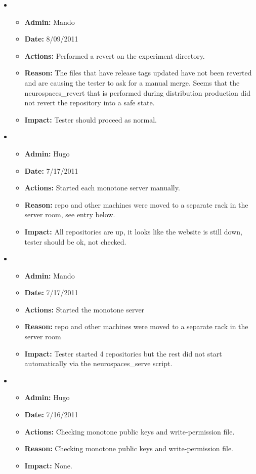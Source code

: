 \documentclass[12pt]{article}
\begin{document}
\begin{itemize}
\item
  \begin{itemize}
  \item[] {\bf Admin:} Mando
  \item[] {\bf Date:} 8/09/2011
  \item[] {\bf Actions:} Performed a revert on the experiment directory. 
  \item[] {\bf Reason:} The files that have release tags updated have not been reverted and are causing the tester to ask for a manual merge. Seems that
  the neurospaces\_revert that is performed during distribution production did not revert the repository into a safe state.
  \item[] {\bf Impact:} Tester should proceed as normal.
  \end{itemize}
  
\item
  \begin{itemize}
  \item[] {\bf Admin:} Hugo
  \item[] {\bf Date:} 7/17/2011
  \item[] {\bf Actions:} Started each monotone server manually.
  \item[] {\bf Reason:} repo and other machines were moved to a
    separate rack in the server room, see entry below.
  \item[] {\bf Impact:} All repositories are up, it looks like the
    website is still down, tester should be ok, not checked.
  \end{itemize}
  
  
\item
  \begin{itemize}
  \item[] {\bf Admin:} Mando
  \item[] {\bf Date:} 7/17/2011
  \item[] {\bf Actions:} Started the monotone server 
  \item[] {\bf Reason:} repo and other machines were moved to a separate rack in the server room
  \item[] {\bf Impact:} Tester started 4 repositories but the rest did not start automatically via the neurospaces\_serve script.
  \end{itemize}
  
  
\item
  \begin{itemize}
  \item[] {\bf Admin:} Hugo
  \item[] {\bf Date:} 7/16/2011
  \item[] {\bf Actions:} Checking monotone public keys and write-permission file.
  \item[] {\bf Reason:} Checking monotone public keys and write-permission file.
  \item[] {\bf Impact:} None.
  \end{itemize}



\end{itemize}
\end{document}
